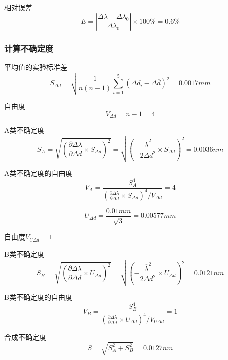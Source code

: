 \documentclass[12pt,a4paper,UTF8]{ctexart}
\begin{document}
相对误差 
\begin{equation*}
	E=\left\lvert \frac{\varDelta \lambda-\varDelta \lambda_0}{\varDelta \lambda_0}\right\rvert \times 100\%=0.6\%
\end{equation*}

\subsubsection*{计算不确定度}
平均值的实验标准差
\begin{equation*}
	S_{\varDelta d}=\sqrt{\frac{1}{n(n-1)}\sum_{i = 1}^{5}(\varDelta d_i-\varDelta \overline{d})^{2}} =0.0017mm
\end{equation*}

自由度
\begin{equation*}
	V_{\varDelta d}=n-1=4
\end{equation*}

A类不确定度
\begin{equation*}
	S_A=\sqrt{{\left( \frac{\partial \varDelta \lambda}{\partial \varDelta d}\times S_{\varDelta d}\right) }^2}=
	\sqrt{{\left( -\frac{\overline{\lambda}^2}{2 \varDelta d^2}\times S_{\varDelta d}\right) }^2}=0.0036nm
\end{equation*}

A类不确定度的自由度
\begin{equation*}
	V_A=\frac{S_A^4}{\left( \frac{\partial \varDelta \lambda}{\partial \varDelta d}\times S_{\varDelta d}\right) ^4 / V_{\varDelta d}}=4
\end{equation*}

\begin{equation*}
	U_{\varDelta d}=\frac{0.01mm}{\sqrt{3}}=0.00577mm
\end{equation*}

自由度$V_{U \varDelta d}=1$

B类不确定度
\begin{equation*}
	S_B=\sqrt{{\left( \frac{\partial \varDelta \lambda}{\partial \varDelta d}\times U_{\varDelta d}\right) }^2}=
	\sqrt{{\left( -\frac{\overline{\lambda}^2}{2 \varDelta d^2}\times U_{\varDelta d}\right) }^2}=0.0121nm
\end{equation*}

B类不确定度的自由度
\begin{equation*}
	V_B=\frac{S_B^4}{\left( \frac{\partial \varDelta \lambda}{\partial \varDelta d}\times U_{\varDelta d}\right) ^4 / V_{U \varDelta d}}=1
\end{equation*}

合成不确定度
\begin{equation*}
	S= \sqrt{S_A^2+S_B^2}=0.0127nm
\end{equation*}
\end{document}

